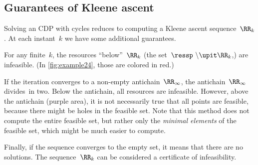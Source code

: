 \subsection{Guarantees of Kleene ascent}

Solving an CDP with cycles reduces to computing a Kleene ascent sequence~$\RR_{k}$.
At each instant~$k$ we have some additional guarantees.

For any finite~$k$, the resources ``below''~$\RR_{k}$ (the set~$\ressp\ \backslash\upit\RR_{k}$,) are infeasible.
(In \cref{fig:example24}, those are colored in red.)

If the iteration converges to a non-empty antichain~$\RR_{\infty}$, the antichain~$\RR_{\infty}$ divides~\ressp in two.
Below the antichain, all resources are infeasible.
However, above the antichain (purple area), it is not necessarily true that all points are feasible, because there might be holes in the feasible set.
Note that this method does not compute the entire feasible set, but rather only the \emph{minimal elements} of the feasible set, which might be much easier to compute.

Finally, if the sequence converges to the empty set, it means that there are no solutions.
The sequence~$\RR_{k}$ can be considered a certificate of infeasibility.
